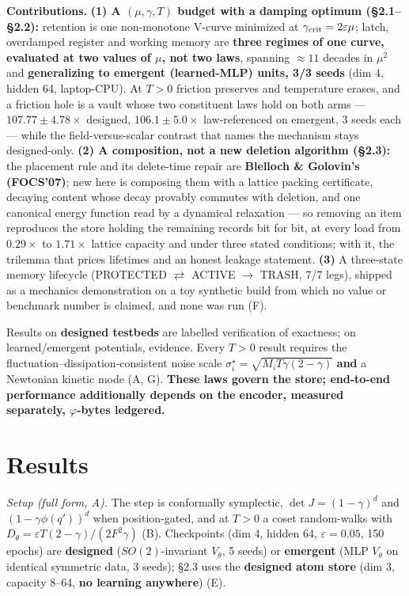 \documentclass{article}
\begin{document}
\textbf{Contributions.} \textbf{(1) A $(\mu,\gamma,T)$ budget with a damping optimum (\S 2.1--\S 2.2):} retention is one non-monotone V-curve minimized at $\gamma_{\rm crit}=2\varepsilon\mu$; latch, overdamped register and working memory are \textbf{three regimes of one curve, evaluated at two values of $\mu$, not two laws}, spanning $\approx11$ decades in $\mu^2$ and \textbf{generalizing to emergent (learned-MLP) units, 3/3 seeds} (dim 4, hidden 64, laptop-CPU). At $T>0$ friction preserves and temperature erases, and a friction hole is a vault whose two constituent laws hold on both arms --- $107.77\pm4.78\times$ designed, $106.1\pm5.0\times$ law-referenced on emergent, 3 seeds each --- while the field-versus-scalar contrast that names the mechanism stays designed-only. \textbf{(2) A composition, not a new deletion algorithm (\S 2.3):} the placement rule and its delete-time repair are \textbf{Blelloch \& Golovin's (FOCS'07)}; new here is composing them with a lattice packing certificate, decaying content whose decay provably commutes with deletion, and one canonical energy function read by a dynamical relaxation --- so removing an item reproduces the store holding the remaining records bit for bit, at every load from $0.29\times$ to $1.71\times$ lattice capacity and under three stated conditions; with it, the trilemma that prices lifetimes and an honest leakage statement. \textbf{(3)} A three-state memory lifecycle (PROTECTED $\rightleftarrows$ ACTIVE $\to$ TRASH, 7/7 legs), shipped as a mechanics demonstration on a toy synthetic build from which no value or benchmark number is claimed, and none was run (F).

Results on \textbf{designed testbeds} are labelled verification of exactness; on learned/emergent potentials, evidence. Every $T>0$ result requires the fluctuation--dissipation-consistent noise scale $\sigma^\star_i=\sqrt{M_iT\gamma(2-\gamma)}$ \textbf{and} a Newtonian kinetic mode (A, G). \textbf{These laws govern the store; end-to-end performance additionally depends on the encoder, measured separately, $\varphi$-bytes ledgered.}

\section{Results}

\emph{Setup (full form, A).} The step is conformally symplectic, $\det J=(1-\gamma)^d$ and $(1-\gamma\phi(q'))^d$ when position-gated, and at $T>0$ a coset random-walks with $D_\theta=\varepsilon T(2-\gamma)/(2F^2\gamma)$ (B). Checkpoints (dim 4, hidden 64, $\varepsilon=0.05$, 150 epochs) are \textbf{designed} ($SO(2)$-invariant $V_\theta$, 5 seeds) or \textbf{emergent} (MLP $V_\theta$ on identical symmetric data, 3 seeds); \S 2.3 uses the \textbf{designed atom store} (dim 3, capacity 8--64, \textbf{no learning anywhere}) (E).
\end{document}
